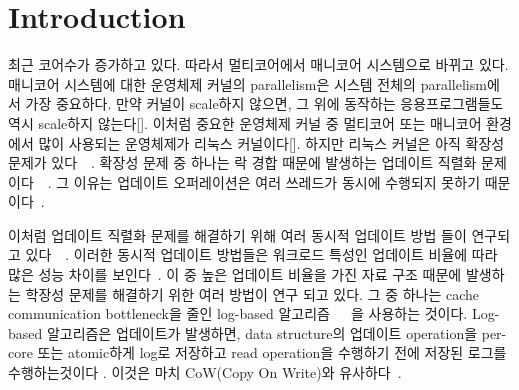 \section{Introduction} \label{sec:introduction}

\ifkor
최근 코어수가 증가하고 있다. 따라서 멀티코어에서 매니코어 시스템으로 바뀌고 있다. 
매니코어 시스템에 대한 운영체제 커널의 parallelism은 시스템 전체의 parallelism에서 가장 중요하다. 
만약 커널이 scale하지 않으면, 그 위에 동작하는 응용프로그램들도 역시 scale하지 않는다[].
이처럼 중요한 운영체제 커널 중 멀티코어 또는 매니코어 환경에서 많이 사용되는 운영체제가 리눅스 커널이다[].
하지만 리눅스 커널은 아직 확장성 문제가
있다~\cite{SilasBoydWickizer2010LinuxScales48}~\cite{Changwoo2016UMSF}.
확장성 문제 중 하나는 락 경합 때문에 발생하는 업데이트 직렬화
문제이다~\cite{Matveev2015RLU}~\cite{Dodds2015SCT}.
그 이유는 업데이트 오퍼레이션은 여러 쓰레드가 동시에 수행되지 못하기
때문이다~\cite{mckenney2011parallel}.
\else
\fi


\ifkor
이처럼 업데이트 직렬화 문제를 해결하기 위해 여러 동시적 업데이트 방법 들이 연구되고
있다~\cite{Arbel2014ConcurrentRCU}~\cite{Matveev2015RLU}.
이러한 동시적 업데이트 방법들은 워크로드 특성인 업데이트 비율에 따라 많은 성능 차이를
보인다~\cite{Matveev2015RLU}.
이 중 높은 업데이트 비율을 가진 자료 구조 때문에 발생하는 학장성 문제를 해결하기 위한 여러 방법이 연구 되고
있다.
그 중 하나는 cache communication bottleneck을 줄인 log-based
알고리즘~\cite{Shalev2006PLS}~\cite{Hendler2010FC}~\cite{SilasBoydWickizerPth}을
사용하는 것이다.
Log-based 알고리즘은 업데이트가 발생하면, data structure의 업데이트 operation을
per-core 또는 atomic하게 log로 저장하고 read operation을 수행하기 전에 저장된 로그를 수행하는것이다 .
이것은 마치 CoW(Copy On Write)와 유사하다~\cite{PaulDetailLWN}.
\else
\fi


